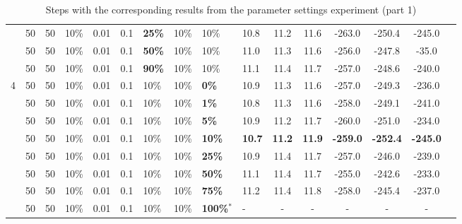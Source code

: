 \begin{sidewaystable}
\begin{tabular}{|l|l|l|l|l|l|l|l|l|l||c|c|c|c|c|c|}
    ~ & 50 & 50 & 10\% & 0.01 & 0.1 & \textbf{25\%} & 10\% & 10\% & 10.8 & 11.2 & 11.6 & -263.0 & -250.4 & -245.0 \\
    ~ & 50 & 50 & 10\% & 0.01 & 0.1 & \textbf{50\%} & 10\% & 10\% & 11.0 & 11.3 & 11.6 & -256.0 & -247.8 & -35.0 \\
    ~ & 50 & 50 & 10\% & 0.01 & 0.1 & \textbf{90\%} & 10\% & 10\% & 11.1 & 11.4 & 11.7 & -257.0 & -248.6 & -240.0 \\
    \hline
       4 & 50 & 50 & 10\% & 0.01 & 0.1 & 10\% & 10\% & \textbf{0\%} & 10.9 & 11.3 & 11.6 & -257.0 & -249.3 & -236.0 \\
    ~ & 50 & 50 & 10\% & 0.01 & 0.1 & 10\% & 10\% & \textbf{1\%} & 10.8 & 11.3 & 11.6 & -258.0 & -249.1 & -241.0 \\
    ~ & 50 & 50 & 10\% & 0.01 & 0.1 & 10\% & 10\% & \textbf{5\%} &  10.9 & 11.2 & 11.7 & -260.0 & -251.0 & -234.0 \\
    ~ & 50 & 50 & 10\% & 0.01 & 0.1 & 10\% & 10\% & \textbf{10\%} & \textbf{10.7} & \textbf{11.2} & \textbf{11.9} & \textbf{-259.0} & \textbf{-252.4} & \textbf{-245.0} \\
    ~ & 50 & 50 & 10\% & 0.01 & 0.1 & 10\% & 10\% & \textbf{25\%} & 10.9 & 11.4 & 11.7 & -257.0 & -246.0 & -239.0 \\
    ~ & 50 & 50 & 10\% & 0.01 & 0.1 & 10\% & 10\% & \textbf{50\%} & 11.1 & 11.4 & 11.7 & -255.0 & -242.6 & -233.0 \\
    ~ & 50 & 50 & 10\% & 0.01 & 0.1 & 10\% & 10\% & \textbf{75\%} & 11.2 & 11.4 & 11.8 & -258.0 & -245.4 & -237.0 \\
    ~ & 50 & 50 & 10\% & 0.01 & 0.1 & 10\% & 10\% & \textbf{100\%$^*$} & - & - & - & - & - & - \\
    \hline
    \end{tabular}
    \caption {Steps with the corresponding results from the parameter settings experiment (part 1)}
    \tiny
    \begin{itemize}[noitemsep]

\end{itemize}
\end{sidewaystable}
